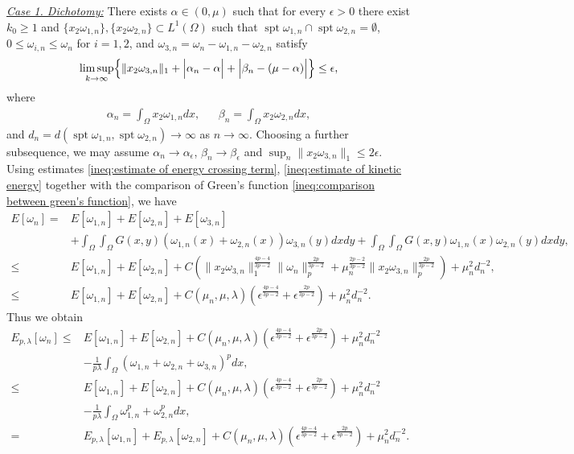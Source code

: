 \documentclass[11pt,letterpaper]{amsart}
\theoremstyle{definition}
\theoremstyle{remark}
\renewcommand{\O}{\Omega}
\newcommand{\spt}{\operatorname{spt}}
\newcommand{\eps}{\epsilon}
\numberwithin{equation}{section}
\begin{document}
\underline{\textit{Case 1. Dichotomy:}} There exists \(\alpha\in(0,\mu)\) such that for every \(\epsilon>0\) there exist \(k_0\ge 1\) and \(\{x_2\omega_{1,n}\},\{x_2\omega_{2,n}\}\subset L^1(\O)\) such that $\spt\omega_{1,n}\cap\spt\omega_{2,n}=\emptyset$, $0\le\omega_{i,n}\le\omega_{n}$ for $i=1,2$, and $\omega_{3,n}=\omega_{n}-\omega_{1,n}-\omega_{2,n}$ satisfy 
\begin{align*}
    \limsup_{k\to\infty}\Bigl\{\|x_2\omega_{3,n}\|_{1}
    + \Bigl|\alpha_n-\alpha\Bigr|
    + \Bigl|\beta_n-(\mu-\alpha)\Bigr|\Bigr\} \leq \epsilon ,
\end{align*}
where 
\begin{align*}
\alpha_n=\int_{\O}x_2\omega_{1,n} dx, && \beta_n=\int_{\O}x_2\omega_{2,n} dx, 
\end{align*}
and $d_n=d(\spt\omega_{1,n},\spt\omega_{2,n}) \to \infty $ as $n \to \infty$. Choosing a further subsequence, we may assume $\alpha_n \to \alpha_\eps $, $\beta_n\to \beta_\eps$ and $\sup_n \|x_2\omega_{3,n}\|_1\leq 2\eps$. Using estimates \eqref{ineq:estimate of energy crossing term}, \eqref{ineq:estimate of kinetic energy} together with the comparison of Green's function \eqref{ineq:comparison between green's function}, we have
\begin{align*}
    E[\omega_n] = & E[\omega_{1,n}] + E[\omega_{2,n}] + E[\omega_{3,n}] \\
    & + \int_{\O}\int_{\O}G(x,y)(\omega_{1,n}(x)+\omega_{2,n}(x))\omega_{3,n}(y)dxdy + \int_{\O}\int_{\O}G(x,y)\omega_{1,n}(x)\omega_{2,n}(y)dxdy, \\
    \leq & E[\omega_{1,n}] + E[\omega_{2,n}] + C\left(  \|x_2\omega_{3,n}\|_{1}^{\frac{4p-4}{3p-2}}\|\omega_n\|_p^{\frac{2p}{3p-2}} + \mu_n^{\frac{2p-2}{3p-2}}\|x_2\omega_{3,n}\|_p^{\frac{2p}{3p-2}}\right) + \mu_n^2 d_n^{-2}, \\
    \leq & E[\omega_{1,n}] + E[\omega_{2,n}] + C(\mu_n, \mu,\lambda) (\eps^{\frac{4p-4}{3p-2}} + \eps^{\frac{2p}{3p-2}}) + \mu_n^2 d_n^{-2}.
\end{align*}
Thus we obtain
\begin{align*}
    E_{p,\lambda}[\omega_n] \leq & E[\omega_{1,n}] + E[\omega_{2,n}] + C(\mu_n, \mu,\lambda) (\eps^{\frac{4p-4}{3p-2}} + \eps^{\frac{2p}{3p-2}}) + \mu_n^2 d_n^{-2}\\
    & -\frac{1}{p\lambda}\int_{\O}(\omega_{1,n}+\omega_{2,n}+\omega_{3,n})^p dx, \\
    \leq &  E[\omega_{1,n}] + E[\omega_{2,n}] + C(\mu_n, \mu,\lambda) (\eps^{\frac{4p-4}{3p-2}} + \eps^{\frac{2p}{3p-2}}) + \mu_n^2 d_n^{-2} \\
    & -\frac{1}{p\lambda}\int_{\O}\omega_{1,n}^p+\omega_{2,n}^p dx, \\
    = & E_{p,\lambda}[\omega_{1,n}] + E_{p,\lambda}[\omega_{2,n}] + C(\mu_n, \mu,\lambda) (\eps^{\frac{4p-4}{3p-2}} + \eps^{\frac{2p}{3p-2}}) + \mu_n^2 d_n^{-2}.
\end{align*}
\end{document}
